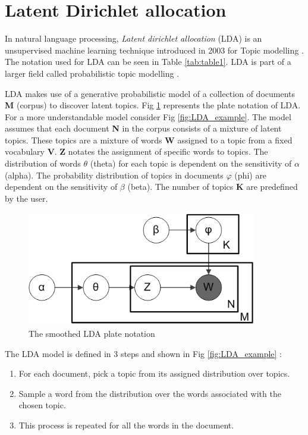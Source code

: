 \section{Latent Dirichlet allocation}\label{theory:lda}
In natural language processing, \textit{Latent dirichlet allocation} (LDA) is an unsupervised machine learning technique introduced in 2003 for Topic modelling \cite{Blei2003}.
The notation used for LDA can be seen in Table \ref{tab:table1}. LDA is part of a larger field called probabilistic topic modelling \cite{Blei2010}.

LDA makes use of a generative probabilistic model of a collection of documents \textbf{M} (corpus) to discover latent topics. Fig \ref{fig:LDA} represents the plate notation of LDA. For a more understandable model consider Fig \ref{fig:LDA_example}. The model assumes that each document \textbf{N} in the corpus consists of a mixture of latent topics. These topics are a mixture of words \textbf{W} assigned to a topic from a fixed vocabulary \textbf{V}. \textbf{Z} notates the assignment of specific words to topics. The distribution of words $\theta$ (theta) for each topic is dependent on the sensitivity of $\alpha$ (alpha). The probability distribution of topics in documents $\varphi$ (phi) are dependent on the sensitivity of $\beta$ (beta). The number of topics \textbf{K} are predefined by the user. 

\begin{figure}
    \centering
    \includegraphics[width=10cm, height=5cm]{methodology/Smoothed_LDA.png}
    \caption{The smoothed LDA plate notation}
    \label{fig:LDA}
\end{figure}

The LDA model is defined in 3 steps and shown in Fig \ref{fig:LDA_example} :
\begin{enumerate}
    \item For each document, pick a topic from its assigned distribution over topics.
    \item Sample a word from the distribution over the words associated with the chosen topic. 
    \item This process is repeated for all the words in the document.
\end{enumerate}


